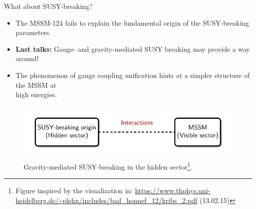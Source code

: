  \begin{frame}{What about SUSY-breaking?}
 \begin{itemize}
 	\item The MSSM-124 fails to explain the fundamental origin of the SUSY-breaking parameters.\\[1em]
 	\item \textbf{Last talks:} Gauge- and gravity-mediated SUSY breaking may provide a way around!\\[1em]
  	\item The phenomenon of \alert{gauge coupling unification} hints at a simpler structure of the MSSM at\\ high energies.\\[1em]
 \end{itemize}
\begin{figure}
	\centering
	\includegraphics[scale= 1.1]{figures/susy_breaking}
	\caption{Gravity-mediated SUSY-breaking in the hidden sector\footnote{Figure inspired by the visualization in: \tiny\url{https://www.thphys.uni-heidelberg.de/~plehn/includes/bad_honnef_12/kribs_2.pdf} (13.02.15)}.}
\end{figure} \end{frame}